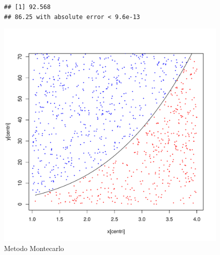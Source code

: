 \documentclass[onecolumn,11pt]{book}\usepackage[]{graphicx}\usepackage[]{color}
\makeatletter
\def\maxwidth{ %
  \ifdim\Gin@nat@width>\linewidth
    \linewidth
  \else
    \Gin@nat@width
  \fi
}
\newenvironment{kframe}{%
 \def\at@end@of@kframe{}%
 \ifinner\ifhmode%
  \def\at@end@of@kframe{\end{minipage}}%
  \begin{minipage}{\columnwidth}%
 \fi\fi%
 \def\FrameCommand##1{\hskip\@totalleftmargin \hskip-\fboxsep
 \colorbox{shadecolor}{##1}\hskip-\fboxsep
     \hskip-\linewidth \hskip-\@totalleftmargin \hskip\columnwidth}%
 \MakeFramed {\advance\hsize-\width
   \@totalleftmargin\z@ \linewidth\hsize
   \@setminipage}}%
 {\par\unskip\endMakeFramed%
 \at@end@of@kframe}
\newenvironment{knitrout}{}{} %
\makeatother
\begin{document}
\begin{figure}[htbp]
\begin{center}
\begin{knitrout}
\color{fgcolor}\begin{kframe}
\begin{verbatim}
## [1] 92.568
## 86.25 with absolute error < 9.6e-13
\end{verbatim}
\end{kframe}
\includegraphics[width=\maxwidth]{figure/unnamed-chunk-150-1} 

\end{knitrout}
\caption{Metodo Montecarlo }
\label{fig:Montec1}
\end{center}
\end{figure}
\end{document}
